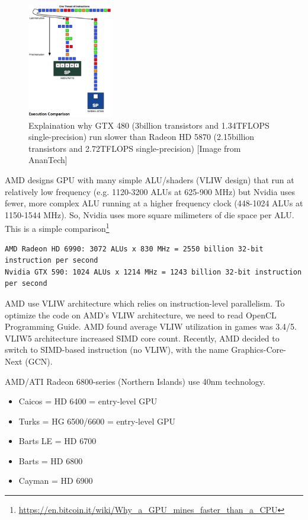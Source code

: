 \begin{figure}[hbt]
  \centerline{\includegraphics[height=5cm,
    angle=0]{./images/VLIW_vs_CUDA-SIMD.eps}}
\caption{Explaination why GTX 480 (3billion transistors and 1.34TFLOPS
single-precision) run slower than Radeon HD 5870 (2.15billion transistors and
2.72TFLOPS single-precision) [Image from AnanTech]}
\label{fig:VLID_vs_CUDA}
\end{figure}


AMD designs GPU with many simple ALU/shaders (VLIW design) that run at
relatively low frequency (e.g. 1120-3200 ALUs at 625-900 MHz) but Nvidia uses
fewer, more complex ALU running at a higher frequency clock (448-1024 ALUs at
1150-1544 MHz). So, Nvidia uses more square milimeters of die space per ALU.
This is a simple
comparison\footnote{\url{https://en.bitcoin.it/wiki/Why_a_GPU_mines_faster_than_a_CPU}}
\begin{verbatim}
AMD Radeon HD 6990: 3072 ALUs x 830 MHz = 2550 billion 32-bit instruction per second
Nvidia GTX 590: 1024 ALUs x 1214 MHz = 1243 billion 32-bit instruction per second 
\end{verbatim}

\begin{framed}
AMD use VLIW architecture which relies on instruction-level parallelism. To
optimize the code on AMD's VLIW architecture, we need to read OpenCL Programming
Guide. AMD found average VLIW utilization in games was 3.4/5. VLIW5 architecture
increased SIMD core count. Recently, AMD decided to switch to SIMD-based
instruction (no VLIW), with the name Graphics-Core-Next (GCN).
\end{framed}

AMD/ATI Radeon 6800-series (Northern Islands) use 40nm technology.
\begin{itemize}
  \item Caicos = HD 6400 = entry-level GPU
  \item Turks = HG 6500/6600 = entry-level GPU 
  \item Barts LE = HD 6700
  \item Barts = HD 6800
  \item Cayman = HD 6900 
\end{itemize}


